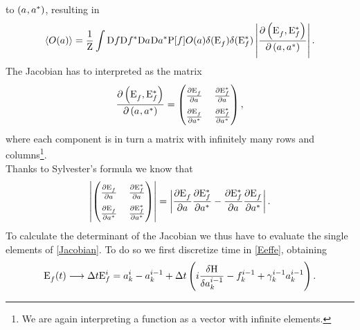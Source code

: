 to $\left( a^{}, a^{*}\right)$, resulting in 
\begin{equation}
    \langle O(a) \rangle = \frac{1}{\mathrm{Z}}\int \mathrm{D} f \mathrm{D} f^* \mathrm{D} a^{} \mathrm{D}a^{*}  \mathrm{P}[f] O(a)\delta(\mathrm{E}_f^{})\delta(\mathrm{E}_f^*)
    \left| \frac{\partial \left( \mathrm{E}_f^{},\mathrm{E}_f^*\right)}{\partial \left( a^{}, a^{*}\right)}\right|.
    \label{expect1}
\end{equation}
The Jacobian has to interpreted as the matrix 
\begin{equation}
     \frac{\partial \left( \Ef,\Efstar\right)}{\partial \left( \anorm, \astar\right)} = 
    \renewcommand{\arraystretch}{1.8}  %
    \setlength{\arraycolsep}{6pt}     %
    \begin{pmatrix}
        \frac{\partial \Ef}{\partial \anorm}  & \frac{\partial \Efstar}{\partial \anorm} \\
        \frac{\partial \Ef}{\partial \astar}  & \frac{\partial \Efstar}{\partial \astar}
    \end{pmatrix}
,
\label{Jacobian}
\end{equation}
where each component is in turn a matrix with infinitely many rows and columns\footnote{We are again interpreting a function as a vector with infinite elements.}. \\
Thanks to Sylvester's formula we know that 
\begin{equation}
    \renewcommand{\arraystretch}{1.8}  %
    \setlength{\arraycolsep}{6pt}     %
    \left|
    \begin{pmatrix}
        \frac{\partial \Ef}{\partial \anorm}  & \frac{\partial \Efstar}{\partial \anorm} \\
        \frac{\partial \Ef}{\partial \astar}  & \frac{\partial \Efstar}{\partial \astar}
    \end{pmatrix}
    \right|
    = \left| \frac{\partial \Ef}{\partial \anorm} \frac{\partial \Efstar}{\partial \astar} - \frac{\partial \Efstar}{\partial \anorm} 
    \frac{\partial \Ef}{\partial \astar}\right|.
    \label{sylvester}
\end{equation}
To calculate the determinant of the Jacobian we thus have to evaluate the single elements of \eqref{Jacobian}. To do so we first discretize time in \eqref{Eeffe}, obtaining
\begin{equation}
    \mathrm{E}_f^{} (t) \longrightarrow \Delta t \mathrm{E}_f^{i} = a_k^i - a_k^{i-1} + 
    \Delta t\left(i \frac{\delta \mathrm{H}}{\delta a_k^{i-1}} - f_k^{i-1} + \gamma_k^{i-1}a_k^{i-1}\right).
    \label{discretization}
\end{equation}
